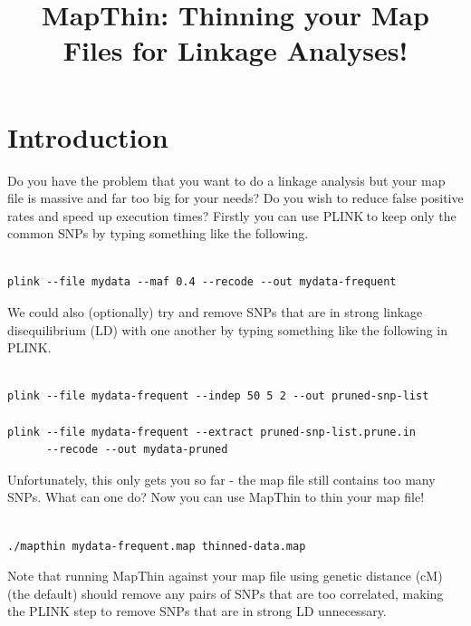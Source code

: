 \documentclass[a4paper,12pt]{article}
\begin{document}
\title{MapThin: Thinning your Map Files for Linkage Analyses!}
\date{}
\author{}
\maketitle
\newpage
\tableofcontents
\newpage
\section{Introduction}
\label{introduction}

Do you have the problem that you want to do a linkage analysis but your map file is massive and far too big for your needs? Do you wish to reduce false positive rates and speed up execution times? Firstly you can use PLINK$\:$to keep only the common SNPs by typing something like the following. 
\vspace{0.35cm} \begin{lstlisting}

plink --file mydata --maf 0.4 --recode --out mydata-frequent

\end{lstlisting} \vspace{0.35cm}
We could also (optionally) try and remove SNPs that are in strong linkage disequilibrium (LD) with one another by typing something like the following in PLINK.

\vspace{0.35cm} \begin{lstlisting}

plink --file mydata-frequent --indep 50 5 2 --out pruned-snp-list

plink --file mydata-frequent --extract pruned-snp-list.prune.in 
      --recode --out mydata-pruned

\end{lstlisting} \vspace{0.35cm}

Unfortunately, this only gets you so far - the map file still contains too many SNPs. What can one do? Now you can use MapThin to thin your map file! 
\vspace{0.35cm} \begin{lstlisting}

./mapthin mydata-frequent.map thinned-data.map

\end{lstlisting} \vspace{0.35cm}
Note that running MapThin against your map file using genetic distance (cM) (the default) should remove any pairs of SNPs that are too correlated, making the PLINK step to remove SNPs that are in strong LD unnecessary. 
\end{document}
